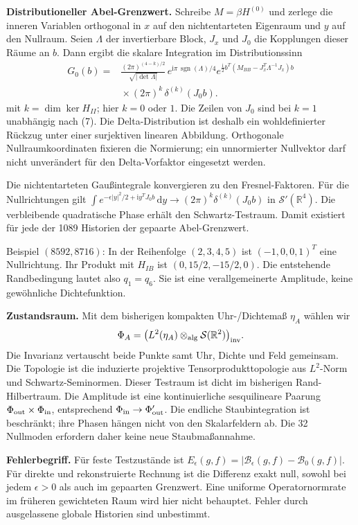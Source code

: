 \documentclass[10pt,a4paper]{article}
\newcommand{\dd}{\,\mathrm d}\newcommand{\ii}{\mathrm i}
\newcommand{\R}{\mathbb R}\newcommand{\one}{\mathbf1}
\newcommand{\Sc}{\mathcal S}\newcommand{\norm}[1]{\lVert#1\rVert}
\begin{document}
\textbf{Distributioneller Abel-Grenzwert.}
Schreibe $M=\beta H^{(0)}$ und zerlege die inneren Variablen orthogonal
in $x$ auf den nichtentarteten Eigenraum und $y$ auf den Nullraum.
Seien $\Lambda$ der invertierbare Block, $J_x$ und $J_0$ die Kopplungen
dieser Räume an $b$. Dann ergibt die skalare Integration im Distributionssinn
\[
 \begin{split}
 G_0(b)={}&
 \frac{(2\pi)^{(4-k)/2}}{\sqrt{|\det\Lambda|}}\,
 e^{\ii\pi\,\operatorname{sgn}(\Lambda)/4}
 e^{\frac{\ii}{2}b^T(M_{BB}-J_x^T\Lambda^{-1}J_x)b}\\
 &{}\times (2\pi)^k\,\delta^{(k)}(J_0b).
 \end{split}                                                \tag{8}
\]
mit $k=\dim\ker H_{II}$; hier $k=0$ oder $1$.
Die Zeilen von $J_0$ sind bei $k=1$ unabhängig nach (7).
Die Delta-Distribution ist deshalb ein wohldefinierter Rückzug unter
einer surjektiven linearen Abbildung. Orthogonale Nullraumkoordinaten fixieren
die Normierung; ein unnormierter Nullvektor darf nicht unverändert
für den Delta-Vorfaktor eingesetzt werden.

Die nichtentarteten Gaußintegrale konvergieren zu den Fresnel-Faktoren.
Für die Nullrichtungen gilt
$\int e^{-\epsilon |y|^2/2+\ii y^TJ_0b}\dd y
\to(2\pi)^k\delta^{(k)}(J_0b)$ in $\Sc'(\R^4)$.
Die verbleibende quadratische Phase erhält den Schwartz-Testraum.
Damit existiert für jede der 1089 Historien der gepaarte Abel-Grenzwert.

Beispiel $(8592,8716)$: In der Reihenfolge $(2,3,4,5)$ ist
$(-1,0,0,1)^T$ eine Nullrichtung.
Ihr Produkt mit $H_{IB}$ ist $(0,15/2,-15/2,0)$.
Die entstehende Randbedingung lautet also $q_1=q_6$.
Sie ist eine verallgemeinerte Amplitude, keine gewöhnliche Dichtefunktion.

\textbf{Zustandsraum.}
Mit dem bisherigen kompakten Uhr-/Dichtemaß $\eta_A$ wählen wir
\[
 \Phi_A=
 \bigl(L^2(\eta_A)\otimes_{\rm alg}\Sc(\R^2)\bigr)_{\rm inv}.
\]
Die Invarianz vertauscht beide Punkte samt Uhr, Dichte und Feld gemeinsam.
Die Topologie ist die induzierte projektive Tensorprodukttopologie
aus $L^2$-Norm und Schwartz-Seminormen.
Dieser Testraum ist dicht im bisherigen Rand-Hilbertraum.
Die Amplitude ist eine kontinuierliche sesquilineare Paarung
$\Phi_{\rm out}\times\Phi_{\rm in}$, entsprechend $\Phi_{\rm in}\to\Phi_{\rm out}'$.
Die endliche Staubintegration ist beschränkt; ihre Phasen hängen nicht von den
Skalarfeldern ab. Die 32 Nullmoden erfordern daher keine neue Staubmaßannahme.

\textbf{Fehlerbegriff.}
Für feste Testzustände ist
$E_\epsilon(g,f)=|\mathcal B_\epsilon(g,f)-\mathcal B_0(g,f)|$.
Für direkte und rekonstruierte Rechnung ist die Differenz exakt null,
sowohl bei jedem $\epsilon>0$ als auch im gepaarten Grenzwert.
Eine uniforme Operatornormrate im früheren gewichteten Raum wird hier
nicht behauptet. Fehler durch ausgelassene globale Historien sind unbestimmt.
\newpage
\end{document}
